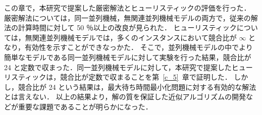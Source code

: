 \documentclass[12pt]{optlab-bachelor}
\begin{document}
この章で，本研究で提案した厳密解法とヒューリスティックの評価を行った．
厳密解法については，同一並列機械，無関連並列機械モデルの両方で，従来の解法の計算時間に対して 50 ％以上の改良が見られた．
ヒューリスティックについては，無関連並列機械モデルでは，多くのインスタンスにおいて競合比が $\infty$ となり，有効性を示すことができなっかた．
そこで，並列機械モデルの中でより簡単なモデルである同一並列機械モデルに対して実験を行った結果，競合比が 24 と定数で収まった．同一並列機械モデルに対して，本研究で提案したヒューリスティックは，競合比が定数で収まることを第~\ref{c_5}~章で証明した．
しかし，競合比が 24 という結果は，最大待ち時間最小化問題に対する有効的な解法とは言えない．
以上の結果より，解の質を保証した近似アルゴリズムの開発などが重要な課題であることが明らかになった．

%
%
%
\end{document}
